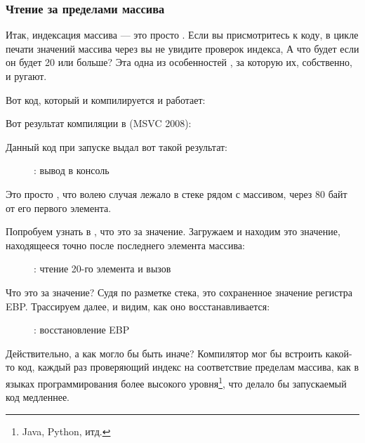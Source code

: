 \subsubsection{Чтение за пределами массива}

Итак, индексация массива --- это просто .  %
Если вы присмотритесь к коду, в цикле печати значений массива через \printf вы 
не увидите проверок индекса,  
А что будет если он будет 20 или больше? 
Эта одна из особенностей \CCpp, за которую их, собственно, и ругают.

Вот код, который и компилируется и работает:



Вот результат компиляции в (MSVC 2008):



Данный код при запуске выдал вот такой результат:

\begin{figure}[h]
\centering
{}
\caption{\olly: вывод в консоль}
\label{fig:array_BO_olly_r3}
\end{figure}

Это просто , что волею случая лежало в стеке рядом с массивом, 
через 80 байт от его первого элемента.

\clearpage
\myindex{\olly}
Попробуем узнать в \olly, что это за значение.
Загружаем и находим это значение, находящееся точно после последнего элемента массива:

\begin{figure}[H]
\centering
{}
\caption{\olly: чтение 20-го элемента и вызов \printf}
\label{fig:array_BO_olly_r1}
\end{figure}

Что это за значение? 
Судя по разметке стека, это сохраненное значение регистра EBP.
\clearpage
Трассируем далее, и видим, как оно восстанавливается:

\begin{figure}[H]
\centering
{}
\caption{\olly: восстановление EBP}
\label{fig:array_BO_olly_r2}
\end{figure}

Действительно, а как могло бы быть иначе? Компилятор мог бы встроить какой-то код, 
каждый раз проверяющий индекс на соответствие пределам массива, как в языках программирования 
более высокого уровня\footnote{Java, Python, итд.}, что делало бы запускаемый код медленнее.


